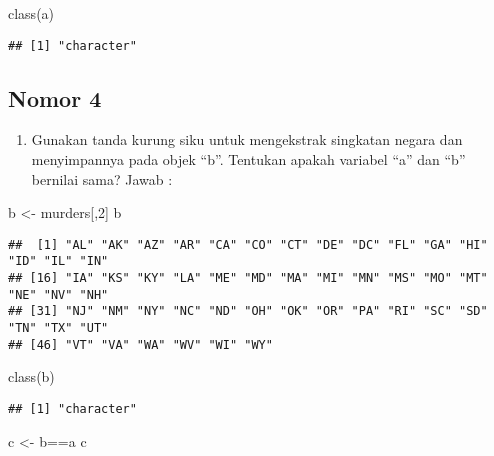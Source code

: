 \documentclass[
]{article}
\newenvironment{Shaded}{\begin{snugshade}}{\end{snugshade}}
\newcommand{\DecValTok}[1]{\textcolor[rgb]{0.00,0.00,0.81}{#1}}
\newcommand{\FunctionTok}[1]{\textcolor[rgb]{0.00,0.00,0.00}{#1}}
\newcommand{\NormalTok}[1]{#1}
\newcommand{\OtherTok}[1]{\textcolor[rgb]{0.56,0.35,0.01}{#1}}
\newcommand{\SpecialCharTok}[1]{\textcolor[rgb]{0.00,0.00,0.00}{#1}}
\providecommand{\tightlist}{%
  \setlength{\itemsep}{0pt}\setlength{\parskip}{0pt}}
\begin{document}
\begin{Shaded}
\begin{Highlighting}[]
\FunctionTok{class}\NormalTok{(a)}
\end{Highlighting}
\end{Shaded}

\begin{verbatim}
## [1] "character"
\end{verbatim}

\hypertarget{nomor-4}{%
\subsection{Nomor 4}\label{nomor-4}}

\begin{enumerate}
\def\labelenumi{\arabic{enumi}.}
\setcounter{enumi}{3}
\tightlist
\item
  Gunakan tanda kurung siku untuk mengekstrak singkatan negara dan
  menyimpannya pada objek ``b''. Tentukan apakah variabel ``a'' dan
  ``b'' bernilai sama? Jawab :
\end{enumerate}

\begin{Shaded}
\begin{Highlighting}[]
\NormalTok{b }\OtherTok{\textless{}{-}}\NormalTok{ murders[,}\DecValTok{2}\NormalTok{]}
\NormalTok{b}
\end{Highlighting}
\end{Shaded}

\begin{verbatim}
##  [1] "AL" "AK" "AZ" "AR" "CA" "CO" "CT" "DE" "DC" "FL" "GA" "HI" "ID" "IL" "IN"
## [16] "IA" "KS" "KY" "LA" "ME" "MD" "MA" "MI" "MN" "MS" "MO" "MT" "NE" "NV" "NH"
## [31] "NJ" "NM" "NY" "NC" "ND" "OH" "OK" "OR" "PA" "RI" "SC" "SD" "TN" "TX" "UT"
## [46] "VT" "VA" "WA" "WV" "WI" "WY"
\end{verbatim}

\begin{Shaded}
\begin{Highlighting}[]
\FunctionTok{class}\NormalTok{(b)}
\end{Highlighting}
\end{Shaded}

\begin{verbatim}
## [1] "character"
\end{verbatim}

\begin{Shaded}
\begin{Highlighting}[]
\NormalTok{c }\OtherTok{\textless{}{-}}\NormalTok{ b}\SpecialCharTok{==}\NormalTok{a}
\NormalTok{c}
\end{Highlighting}
\end{Shaded}
\end{document}
